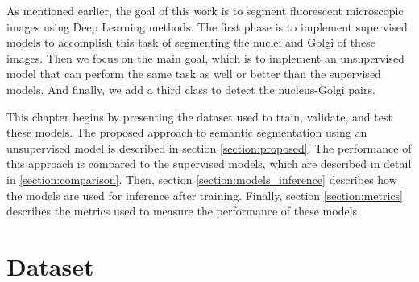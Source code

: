 \cleardoublepage
\label{chapter:methodology}


As mentioned earlier, the goal of this work is to segment fluorescent microscopic images using Deep Learning methods. The first phase is to implement supervised models to accomplish this task of segmenting the nuclei and Golgi of these images. Then we focus on the main goal, which is to implement an unsupervised model that can perform the same task as well or better than the supervised models. And finally, we add a third class to detect the nucleus-Golgi pairs.

This chapter begins by presenting the dataset used to train, validate, and test these models. The proposed approach to semantic segmentation using an unsupervised model is described in section \ref{section:proposed}. The performance of this approach is compared to the supervised models, which are described in detail in \ref{section:comparison}. Then, section \ref{section:models_inference} describes how the models are used for inference after training. Finally, section \ref{section:metrics} describes the metrics used to measure the performance of these models.


\section{Dataset}
\label{section:dataset}

